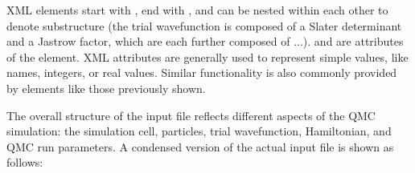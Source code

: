 \documentclass[letterpaper,10pt,english]{sphinxmanual}
\begin{document}
XML elements start with , end with , and can be nested within each other to denote substructure (the trial wavefunction is composed of a Slater determinant and a Jastrow factor, which are each further composed of \(...\)).   and  are attributes of the  element.  XML attributes are generally used to represent simple values, like names, integers, or real values.  Similar functionality is also commonly provided by  elements like those previously shown.

The overall structure of the input file reflects different aspects of the QMC simulation: the simulation cell, particles, trial wavefunction, Hamiltonian, and QMC run parameters.  A condensed version of the actual input file is shown as follows:
\end{document}
